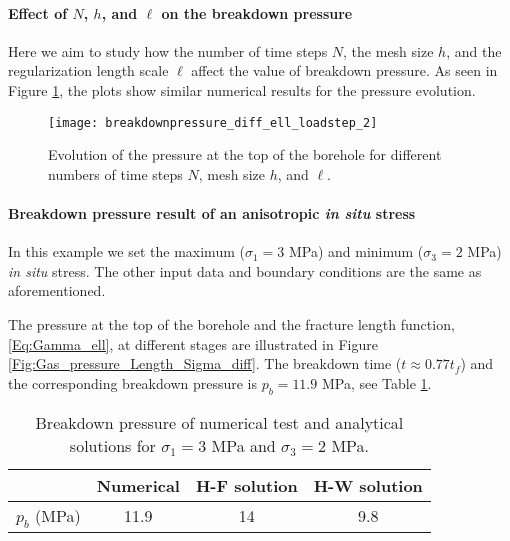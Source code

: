 \paragraph{Effect of $N$, $h$, and $\ell$ on the breakdown pressure}
Here we aim to study how the number of time steps $N$, the mesh size $h$, and the regularization length scale $\ell$ affect the value of breakdown pressure. As seen in Figure \ref{Fig:Gas_Pressure_parameters}, the plots show similar numerical results for the pressure evolution.



\begin{figure}
    \centering
    \texttt{[image: breakdownpressure\_diff\_ell\_loadstep\_2]}
        \caption{Evolution of the pressure at the top of the borehole for different numbers of time steps $N$, mesh size $h$, and $\ell$.}
    \label{Fig:Gas_Pressure_parameters}
\end{figure}

\paragraph{Breakdown pressure result of an anisotropic \emph{in situ} stress} In this example we set the maximum ($\sigma_1=3$ MPa) and minimum ($\sigma_3=2$ MPa)  \emph{in situ} stress. The other input data and boundary conditions are the same as aforementioned.

The pressure at the top of the borehole and the fracture length function, \eqref{Eq:Gamma_ell}, at different stages are  illustrated in Figure \ref{Fig:Gas_pressure_Length_Sigma_diff}. The breakdown time ($t\approx 0.77t_f$) and the corresponding breakdown pressure is $p_b =11.9$ MPa, see Table \ref{Tab:preakdown_anISO_insitustress}.

\begin{table}[htbp]
    \centering
    \caption{Breakdown pressure of numerical test and analytical solutions for $\sigma_1=3$ MPa and $\sigma_3=2$ MPa.}
    \begin{tabular}{l c c c}
    \hline 
           & Numerical & H-F solution & H-W solution \\
    \hline 
           $p_b$ (MPa)& 11.9 & 14 &  9.8 \\
    \hline      
    \end{tabular}
    \label{Tab:preakdown_anISO_insitustress}
\end{table}

